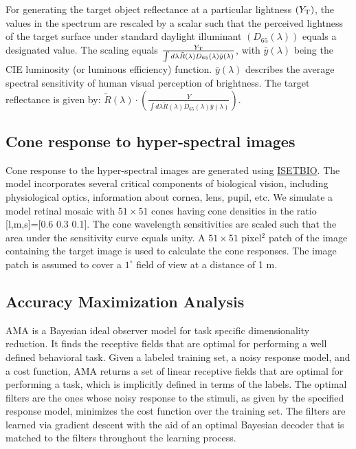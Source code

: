 \documentclass{jov}
\begin{document}
For generating the target object reflectance at a particular lightness $(Y_{\rm T})$, the values in the spectrum are 
rescaled by a scalar such that the perceived lightness of the 
target surface under standard daylight illuminant $(D_{65}(\lambda))$ 
equals a designated value. The scaling equals $\frac{Y_{\rm T}}{\int d\lambda \tilde{R}(\lambda) D_{65}(\lambda) \bar{y}(\lambda)}$, with $\bar{y}(\lambda)$ being the CIE luminosity (or luminous efficiency) function. 
$\bar{y}(\lambda)$ describes the average spectral sensitivity of human visual 
perception of brightness. The target reflectance is given by: $\tilde{R}(\lambda) \cdot\left(\frac{Y}{\int d\lambda \tilde{R}(\lambda) D_{65}(\lambda) \bar{y}(\lambda)}\right)$.

\subsection{Cone response to hyper-spectral images}
Cone response to the hyper-spectral images are generated
using \href{https://github.com/isetbio}{ISETBIO}. The model incorporates several critical components of biological vision, including physiological optics, information about cornea, lens, pupil, etc. We simulate a model retinal mosaic with $51\times51$ cones having cone densities in the ratio [l,m,s]=[0.6 0.3 0.1]. The cone wavelength sensitivities are scaled such that the area under the sensitivity curve equals unity. A $51\times51$ pixel$^2$ patch of the image containing the target image is used to calculate the cone responses. The image patch is assumed to cover a $1^{\circ}$ field of view at a distance of 1 m. 

\subsection{Accuracy Maximization Analysis}
AMA \cite{geisler2009optimal,burge2017accuracy} is a Bayesian ideal observer model for task specific dimensionality reduction. It finds the receptive fields that are optimal for performing a well defined behavioral task. Given a labeled training set, a noisy response model, and a cost function, AMA returns a set of linear receptive fields that are optimal for performing a task, which is implicitly defined in terms of the labels. The optimal filters are the ones whose noisy response to the stimuli, as given by the specified response model, minimizes the cost function over the training set. The filters are learned via gradient descent with the aid of an optimal Bayesian decoder that is matched to the filters throughout the learning process. 
\end{document}
